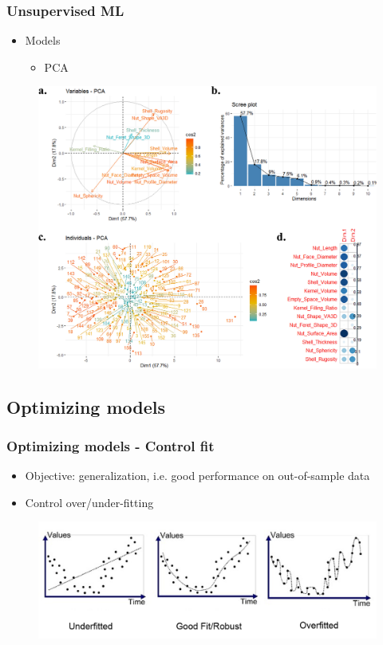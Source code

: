 \begin{frame}\frametitle{Unsupervised ML}
   \begin{itemize}
      \item Models
      \begin{itemize}
         \item PCA
      \end{itemize}
   \end{itemize}
   \begin{figure}[H]
      \includegraphics[scale=.12]{../images/illustrations/model_pca_graphs.png}
   \end{figure}
\end{frame}




\subsection{Optimizing models}

\begin{frame}\frametitle{Optimizing models - Control fit}
   \begin{itemize}
      \item Objective: generalization, i.e. good performance on out-of-sample data
      \item Control over/under-fitting
   \end{itemize}
   \begin{figure}[H]
      \includegraphics[scale=.25]{../images/illustrations/model_fit.png}
   \end{figure}
\end{frame}

